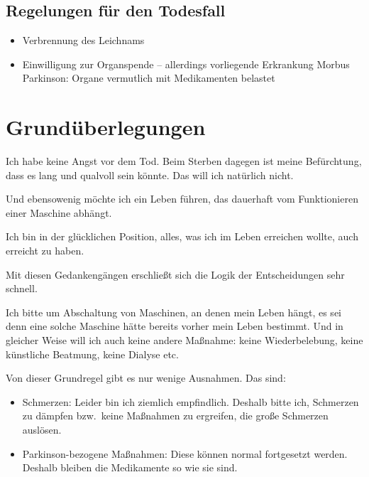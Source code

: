 \documentclass[pdftex,12pt,a4paper]{article}
\begin{document}
\subsection{Regelungen für den Todesfall}

\begin{itemize}

\item Verbrennung des Leichnams

\item Einwilligung zur Organspende -- allerdings vorliegende Erkrankung
Morbus Parkinson: Organe vermutlich mit Medikamenten belastet

\end{itemize}


\newpage


\section{Grundüberlegungen}

Ich habe keine Angst vor dem Tod. Beim Sterben dagegen ist meine 
Befürchtung, dass es lang und qualvoll sein könnte. Das will ich natürlich nicht.

Und ebensowenig möchte ich ein Leben führen, das dauerhaft vom
Funktionieren einer Maschine abhängt.  

Ich bin in der glücklichen Position, alles, was ich im Leben
erreichen wollte, auch erreicht zu haben. 

Mit diesen Gedankengängen erschließt sich die Logik der Entscheidungen 
sehr schnell.

Ich bitte um Abschaltung von Maschinen, an denen mein Leben hängt, 
es sei denn eine solche Maschine hätte bereits vorher 
mein Leben bestimmt. Und in gleicher Weise will ich auch keine
andere Maßnahme: keine Wiederbelebung, 
keine künstliche Beatmung, keine Dialyse etc.
 
Von dieser Grundregel gibt es nur wenige Ausnahmen. Das sind:

\begin{itemize}

\item Schmerzen: Leider bin ich ziemlich empfindlich. Deshalb 
bitte ich,
Schmerzen zu dämpfen bzw.\ keine Maßnahmen zu ergreifen, die große 
Schmerzen auslösen.

\item Parkinson-bezogene Maßnahmen: Diese können normal
fortgesetzt werden. Deshalb bleiben die Medikamente
so wie sie sind.

\end{itemize}
\end{document}
